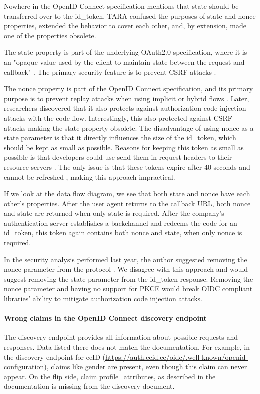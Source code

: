 Nowhere in the OpenID Connect specification mentions that state should be transferred over to the id\_token. TARA confused the purposes of state and nonce properties, extended the behavior to cover each other, and, by extension, made one of the properties obsolete.

The state property is part of the underlying OAuth2.0 specification, where it is an "opaque value used by the client to maintain state between the request and callback" \cite{rfc6749}. The primary security feature is to prevent CSRF attacks \cite{rfc6749,ietf-oauth-security-topics-19}.

The nonce property is part of the OpenID Connect specification, and its primary purpose is to prevent replay attacks when using implicit or hybrid flows \cite{oidc}. Later, researchers discovered that it also protects against authorization code injection attacks with the code flow. Interestingly, this also protected against CSRF attacks making the state property obsolete. The disadvantage of using {nonce} as a state parameter is that it directly influences the size of the id\_token, which should be kept as small as possible. Reasons for keeping this token as small as possible is that developers could use send them in request headers to their resource servers \cite{rfc7519}. The only issue is that these tokens expire after 40 seconds and cannot be refreshed \cite{tara-technical}, making this approach impractical.

If we look at the data flow diagram, we see that both state and nonce have each other's properties. After the user agent returns to the callback URL, both {nonce} and {state} are returned when only {state} is required. After the company's authentication server establishes a backchannel and redeems the code for an id\_token, this token again contains both {nonce} and {state}, when only {nonce} is required.

In the security analysis performed last year, the author suggested removing the nonce parameter from the protocol \cite{tara-security-arnis}. We disagree with this approach and would suggest removing the state parameter from the id\_token response. Removing the nonce parameter and having no support for PKCE would break OIDC compliant libraries' ability to mitigate authorization code injection attacks.

\paragraph{Wrong claims in the OpenID Connect discovery endpoint} The discovery endpoint provides all information about possible requests and responses. Data listed there does not match the documentation. For example, in the discovery endpoint for eeID (\url{https://auth.eeid.ee/oidc/.well-known/openid-configuration}), claims like gender are present, even though this claim can never appear. On the flip side, claim profile\_attributes, as described in the documentation is missing from the discovery document.

